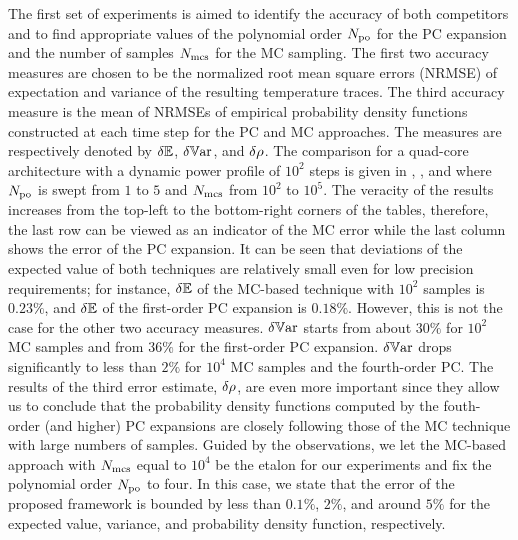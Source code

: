


The first set of experiments is aimed to identify the accuracy of both competitors and to find appropriate values of the polynomial order ${N_\text{po}}$ for the PC expansion and the number of samples $N_\text{mcs}$ for the MC sampling. The first two accuracy measures are chosen to be the normalized root mean square errors (NRMSE) of expectation and variance of the resulting temperature traces. The third accuracy measure is the mean of NRMSEs of empirical probability density functions constructed at each time step for the PC and MC approaches. The measures are respectively denoted by $\delta\mathbb{E}$, $\delta\mathbb{V}\text{ar}$, and $\delta\rho$. The comparison for a quad-core architecture with a dynamic power profile of $10^2$ steps is given in , , and  where ${N_\text{po}}$ is swept from $1$ to $5$ and $N_\text{mcs}$ from $10^2$ to $10^5$. The veracity of the results increases from the top-left to the bottom-right corners of the tables, therefore, the last row can be viewed as an indicator of the MC error while the last column shows the error of the PC expansion. It can be seen that deviations of the expected value of both techniques are relatively small even for low precision requirements; for instance, $\delta\mathbb{E}$ of the MC-based technique with $10^2$ samples is $0.23\%$, and $\delta\mathbb{E}$ of the first-order PC expansion is $0.18\%$. However, this is not the case for the other two accuracy measures. $\delta\mathbb{V}\text{ar}$ starts from about $30\%$ for $10^2$ MC samples and from $36\%$ for the first-order PC expansion. $\delta\mathbb{V}\text{ar}$ drops significantly to less than $2\%$ for $10^4$ MC samples and the fourth-order PC. The results of the third error estimate, $\delta\rho$, are even more important since they allow us to conclude that the probability density functions computed by the fouth-order (and higher) PC expansions are closely following those of the MC technique with large numbers of samples. Guided by the observations, we let the MC-based approach with $N_\text{mcs}$ equal to $10^4$ be the etalon for our experiments and fix the polynomial order ${N_\text{po}}$ to four. In this case, we state that the error of the proposed framework is bounded by less than $0.1\%$, $2\%$, and around $5\%$ for the expected value, variance, and probability density function, respectively.

